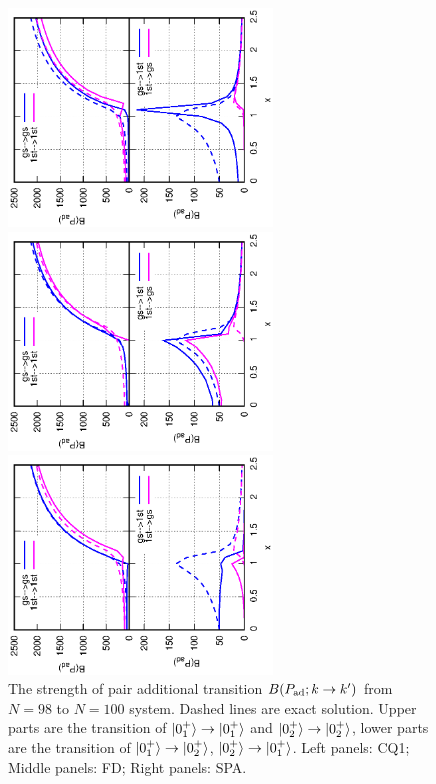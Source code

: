 \documentclass[%
superscriptaddress,
preprint,
showpacs,
nofootinbib,
amsmath,amssymb,
prc,
floatfix ]%
{revtex4-1}
\begin{document}
\begin{figure}[htbp]
 \begin{minipage}{0.3\hsize}
 \begin{center}
  \includegraphics[width=70mm,angle=-90]{images/N100Pad_CQ.eps}
 \end{center}
 \captionsetup{labelformat=empty,labelsep=none}
 \end{minipage}
 \begin{minipage}{0.3\hsize}
 \begin{center}
  \includegraphics[width=70mm,angle=-90]{images/N100Pad_FD.eps}
 \end{center}
 \captionsetup{labelformat=empty,labelsep=none}
 \end{minipage}
 \begin{minipage}{0.3\hsize}
 \begin{center}
  \includegraphics[width=70mm,angle=-90]{images/N100Pad_SPA.eps}
 \end{center}
 \captionsetup{labelformat=empty,labelsep=none}
 \end{minipage}
 \caption{The strength of pair additional transition $B(P_{\rm ad};k\rightarrow k')$ from $N=98$ to $N=100$ system. Dashed lines are exact solution. Upper parts are the transition of $\ket{0_1^+}\to\ket{0_1^+}$ and $\ket{0_2^+}\to\ket{0_2^+}$, lower parts are the transition of $\ket{0_1^+}\to\ket{0_2^+}$, $\ket{0_2^+}\to\ket{0_1^+}$. Left panels: CQ1; Middle panels: FD; Right panels: SPA.}
 \label{fig:N100Pad}
\end{figure}
\end{document}
